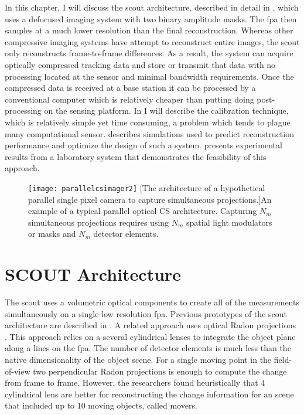 In this chapter, I will discuss the \gls{scout} architecture, described in detail in , which uses a defocused imaging system with two binary amplitude masks. The \gls{fpa} then samples at a much lower resolution than the final reconstruction. Whereas other compressive imaging systems have attempt to reconstruct entire images, the \gls{scout} only reconstructs frame-to-frame differences. As a result, the system can acquire optically compressed tracking data and store or transmit that data with no processing located at the sensor and minimal bandwidth requirements. Once the compressed data is received at a base station it can be processed by a conventional computer which is relatively cheaper than putting doing post-processing on the sensing platform. In  I will describe the calibration technique, which is relatively simple yet time consuming, a problem which tends to plague many computational sensor.  describes simulations used to predict reconstruction performance and optimize the design of such a system.  presents experimental results from a laboratory system that demonstrates the feasibility of this approach. 

\begin{figure}
	\texttt{[image: parallelcsimager2]}
	[The architecture of a hypothetical parallel single pixel camera to capture simultaneous projections.]{An example of a typical parallel optical CS architecture. Capturing $N_m$ simultaneous projections requires using $N_m$ spatial light modulators or masks and $N_m$ detector elements.}
	\label{fig:parallelcsimager2}
\end{figure}




\section{SCOUT Architecture}\label{sec:ScoutArchitecture}

The \gls{scout} uses a volumetric optical components to create all of the measurements simultaneously on a single low resolution \gls{fpa}. Previous prototypes of the \gls{scout} architecture are described in \cite{stenner2010static, rivenson2010single}. A related approach uses optical Radon projections \cite{kashter2012optical}. This approach relies on a several cylindrical lenses to integrate the object plane along a lines on the \gls{fpa}. The number of detector elements is much less than the native dimensionality of the object scene. For a single moving point in the field-of-view two perpendicular Radon projections is enough to compute the change from frame to frame. However, the researchers found heuristically that $4$ cylindrical lens are better for reconstructing the change information for an scene that included up to $10$ moving objects, called movers. 

